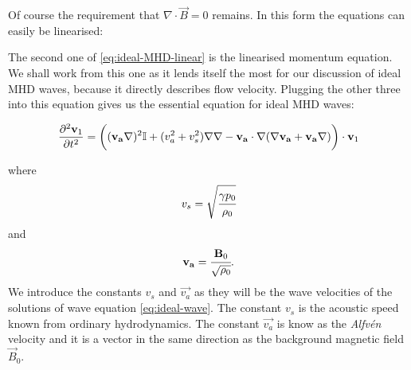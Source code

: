 Of course the requirement that $ \nabla \cdot \vec{B} = 0  $ remains. In this form the equations can easily be linearised:

{\centering 
\noindent {}
\par}

The second one of \cref{eq:ideal-MHD-linear} is the linearised momentum equation. 
We shall work from this one as it lends itself the most for our discussion of ideal MHD waves, because it directly describes flow velocity. 
Plugging the other three into this equation gives us the essential equation for ideal MHD waves:

\begin{equation}
	\label{eq:ideal-wave}		
		\frac{\partial^2 \vec{v}_1}{\partial t^2} = \bigg( (\vec{v_a} \nabla)^2 \I + (v_a^2 + v_s^2)\nabla \nabla - \vec{v_a} \cdot \nabla (\nabla \vec{v_a} + \vec{v_a} \nabla) \bigg) \cdot \vec{v}_1
\end{equation}

\noindent where
\begin{equation}
v_s = \sqrt{\cfrac{\gamma p_0}{\rho_0}}
\label{eq:acoustic-speed}
\end{equation}
and
\begin{equation}
\vec{v_a} = \cfrac{\vec{B}_0}{\sqrt{\rho_0}}.
\label{eq:Alfven-speed}
\end{equation}
We introduce the constants $v_s$ and $\vec{v_a}$ as they will be the wave velocities of the solutions of wave equation \cref{eq:ideal-wave}. 
The constant $v_s$ is the acoustic speed known from ordinary hydrodynamics. 
The constant $\vec{v_a}$ is know as the \emph{Alfvén} velocity and it is a vector in the same direction as the background magnetic field $\vec{B}_0$.

